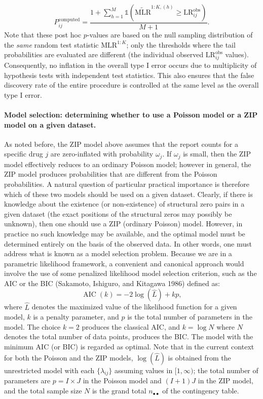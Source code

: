 \[P^{\text{computed}}_{ij} = \frac{1 + \sum_{h=1}^M \mathbb{1}\left(\widetilde{\text{MLR}}^{1:K, (h)} \geq \text{LR}_{ij}^{\text{obs}} \right)}{M+1}.
\] Note that these post hoc \(p\)-values are based on the null sampling distribution of the \emph{same} random test statistic \(\text{MLR}^{1:K}\); only the thresholds where the tail probabilities are evaluated are different (the individual observed \(\text{LR}_{ij}^{\text{obs}}\) values). Consequently, no inflation in the overall type I error occurs due to multiplicity of hypothesis tests with independent test statistics. This also ensures that the false discovery rate of the entire procedure is controlled at the same level as the overall type I error.

\hypertarget{model-selection-determining-whether-to-use-a-poisson-model-or-a-zip-model-on-a-given-dataset.}{%
\paragraph{Model selection: determining whether to use a Poisson model or a ZIP model on a given dataset.}\label{model-selection-determining-whether-to-use-a-poisson-model-or-a-zip-model-on-a-given-dataset.}}

As noted before, the ZIP model above assumes that the report counts for a specific drug \(j\) are zero-inflated with probability \(\omega_{j}\). If \(\omega_{j}\) is small, then the ZIP model effectively reduces to an ordinary Poisson model; however in general, the ZIP model produces probabilities that are different from the Poisson probabilities. A natural question of particular practical importance is therefore which of these two models should be used on a given dataset. Clearly, if there is knowledge about the existence (or non-existence) of structural zero pairs in a given dataset (the exact positions of the structural zeros may possibly be unknown), then one should use a ZIP (ordinary Poisson) model. However, in practice no such knowledge may be available, and the optimal model must be determined entirely on the basis of the observed data. In other words, one must address what is known as a model selection problem. Because we are in a parametric likelihood framework, a convenient and canonical approach would involve the use of some penalized likelihood model selection criterion, such as the AIC or the BIC (Sakamoto, Ishiguro, and Kitagawa 1986) defined as:\\
\[
\operatorname{AIC}(k) = -2 \log(\hat{L}) + k p,
\] where \(\hat{L}\) denotes the maximized value of the likelihood function for a given model, \(k\) is a penalty parameter, and \(p\) is the total number of parameters in the model. The choice \(k = 2\) produces the classical AIC, and \(k = \log N\) where \(N\) denotes the total number of data points, produces the BIC. The model with the minimum AIC (or BIC) is regarded as optimal. Note that in the current context for both the Poisson and the ZIP models, \(\log(\hat{L})\) is obtained from the unrestricted model with each \(\{\lambda_{ij}\}\) assuming values in \([1, \infty)\); the total number of parameters are \(p = I \times J\) in the Poisson model and \((I + 1)J\) in the ZIP model, and the total sample size \(N\) is the grand total \(n_{\bullet \bullet}\) of the contingency table.

